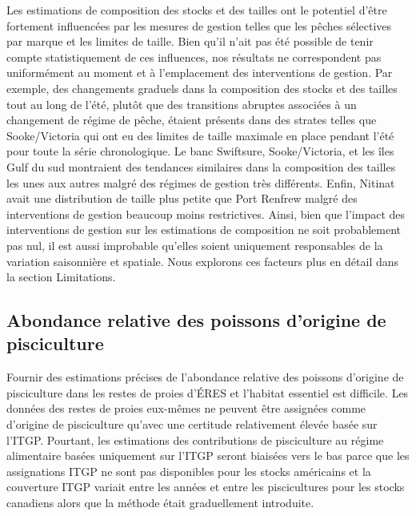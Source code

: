 Les estimations de composition des stocks et des tailles ont le potentiel d'être fortement influencées par les mesures de gestion telles que les pêches sélectives par marque et les limites de taille. Bien qu'il n'ait pas été possible de tenir compte statistiquement de ces influences, nos résultats ne correspondent pas uniformément au moment et à l'emplacement des interventions de gestion. Par exemple, des changements graduels dans la composition des stocks et des tailles tout au long de l'été, plutôt que des transitions abruptes associées à un changement de régime de pêche, étaient présents dans des strates telles que Sooke/Victoria qui ont eu des limites de taille maximale en place pendant l'été pour toute la série chronologique. Le banc Swiftsure, Sooke/Victoria, et les îles Gulf du sud montraient des tendances similaires dans la composition des tailles les unes aux autres malgré des régimes de gestion très différents. Enfin, Nitinat avait une distribution de taille plus petite que Port Renfrew malgré des interventions de gestion beaucoup moins restrictives. Ainsi, bien que l'impact des interventions de gestion sur les estimations de composition ne soit probablement pas nul, il est aussi improbable qu'elles soient uniquement responsables de la variation saisonnière et spatiale. Nous explorons ces facteurs plus en détail dans la section Limitations.

\subsection{Abondance relative des poissons d'origine de pisciculture}

Fournir des estimations précises de l'abondance relative des poissons d'origine de pisciculture dans les restes de proies d'ÉRES et l'habitat essentiel est difficile. Les données des restes de proies eux-mêmes ne peuvent être assignées comme d'origine de pisciculture qu'avec une certitude relativement élevée basée sur l'ITGP. Pourtant, les estimations des contributions de pisciculture au régime alimentaire basées uniquement sur l'ITGP seront biaisées vers le bas parce que les assignations ITGP ne sont pas disponibles pour les stocks américains et la couverture ITGP variait entre les années et entre les piscicultures pour les stocks canadiens alors que la méthode était graduellement introduite.

